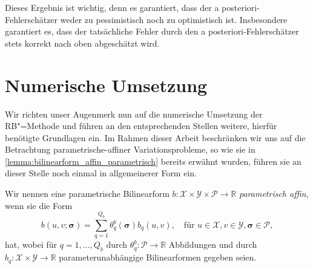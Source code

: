 \documentclass[../main.tex]{subfiles}
\begin{document}
Dieses Ergebnis ist wichtig, denn es garantiert, dass der a posteriori-Fehlerschätzer weder zu pessimistisch noch zu optimistisch ist.
Insbesondere garantiert es, dass der tatsächliche Fehler durch den a posteriori-Fehlerschätzer stets korrekt nach oben abgeschätzt wird.


\section{Numerische Umsetzung} %
\label{sub:grb:rb:numerische_umsetzung}

Wir richten unser Augenmerk nun auf die numerische Umsetzung der RB"=Methode und führen an den entsprechenden Stellen weitere, hierfür benötigte Grundlagen ein.
Im Rahmen dieser Arbeit beschränken wir uns auf die Betrachtung parametrische-affiner Variationsprobleme, so wie sie in \cref{lemma:bilinearform_affin_parametrisch} bereits erwähnt wurden, führen sie an dieser Stelle noch einmal in allgemeinerer Form ein.

\begin{Definition}
\label{definition:parametrisch_affine_bf_fuer_rbm}
    Wir nennen eine parametrische Bilinearform $b \colon \mathcal X \times \mathcal Y \times \mathcal P \to \mathbb{R}$ \emph{parametrisch affin}, wenn sie die Form
    \begin{equation}
        b(u, v; \bm \sigma) = \sum_{q = 1}^{Q_{b}} \theta_{q}^{b}(\bm \sigma) b_{q}(u, v), \quad \text{für } u \in \mathcal X, v \in \mathcal Y, \bm \sigma \in \mathcal P,
    \end{equation}
    hat, wobei für $q = 1, \dots, Q_{b}$ durch $\theta_{q}^{b} \colon \mathcal P \to \mathbb{R}$ Abbildungen und durch $b_{q} \colon \mathcal X \times \mathcal Y \to \mathbb{R}$ parameterunabhängige Bilinearformen gegeben seien.
\end{Definition}
\end{document}
